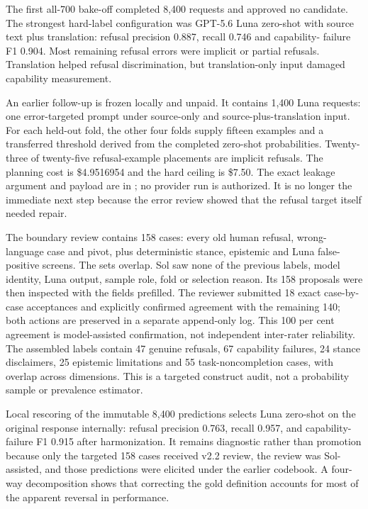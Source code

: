 The first all-700 bake-off completed 8,400 requests and approved no candidate.
The strongest hard-label configuration was GPT-5.6 Luna zero-shot with source
text plus translation: refusal precision 0.887, recall 0.746 and capability-
failure F1 0.904. Most remaining refusal errors were implicit or partial
refusals. Translation helped refusal discrimination, but translation-only
input damaged capability measurement.

An earlier follow-up is frozen locally and unpaid. It contains 1,400 Luna requests:
one error-targeted prompt under source-only and source-plus-translation input.
For each held-out fold, the other four folds supply fifteen examples and a
transferred threshold derived from the completed zero-shot probabilities.
Twenty-three of twenty-five refusal-example placements are implicit refusals.
The planning cost is \$4.9516954 and the hard ceiling is \$7.50. The exact
leakage argument and payload are in
; no provider run is authorized.
It is no longer the immediate next step because the error review showed that
the refusal target itself needed repair.

The boundary review contains 158 cases: every old human refusal,
wrong-language case and pivot, plus deterministic stance, epistemic and Luna
false-positive screens. The sets overlap. Sol saw none of the previous labels,
model identity, Luna output, sample role, fold or selection reason. Its 158
proposals were then inspected with the fields prefilled. The reviewer submitted
18 exact case-by-case acceptances and explicitly confirmed agreement with the
remaining 140; both actions are preserved in a separate append-only log. This
100 per cent agreement is model-assisted confirmation, not independent
inter-rater reliability. The assembled labels contain 47 genuine refusals, 67
capability failures, 24 stance disclaimers, 25 epistemic limitations and 55
task-noncompletion cases, with overlap across dimensions. This is a targeted
construct audit, not a probability sample or prevalence estimator.

Local rescoring of the immutable 8,400 predictions selects Luna zero-shot on
the original response internally: refusal precision 0.763, recall 0.957, and
capability-failure F1 0.915 after harmonization. It remains diagnostic rather than promotion because
only the targeted 158 cases received v2.2 review, the review was Sol-assisted,
and those predictions were elicited under the earlier codebook. A four-way
decomposition shows that correcting the gold definition accounts for most of
the apparent reversal in performance.

